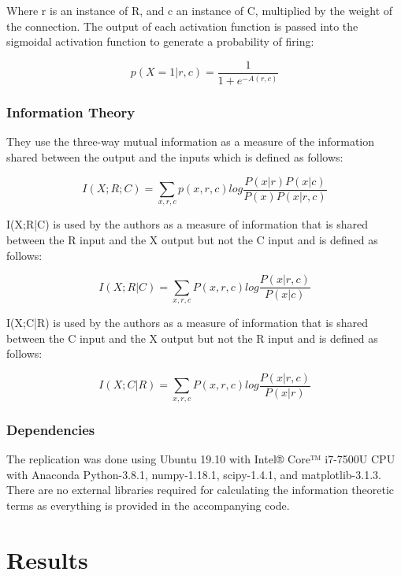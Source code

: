 Where r is an instance of  R, and c an instance of C, multiplied by the weight of the connection. The output of each activation function is passed into the sigmoidal activation function to generate a probability of firing:

\begin{equation}
p(X=1 | r,c) = \frac{1}{1 + e^{-A(r,c)}} 
\end{equation}


\subsubsection{Information Theory}
They use the three-way mutual information as a measure of the information shared between the output and the inputs which is defined as follows:

\begin{equation}
I(X;R;C) = \sum_{x,r,c}p(x,r,c)log\frac{P(x|r)P(x|c)}{P(x)P(x|r,c)}
\end{equation}

I(X;R|C) is used by the authors as a measure of information that is shared between the R input and the X output but not the C input and is defined as follows: 

\begin{equation}
I(X;R|C) = \sum_{x,r,c}P(x,r,c)log\frac{P(x|r,c)}{P(x|c)}
\end{equation}

I(X;C|R) is used by the authors as a measure of information that is shared between the C input and the X output but not the R input and is defined as follows:

\begin{equation}
I(X;C|R) = \sum_{x,r,c}P(x,r,c)log\frac{P(x|r,c)}{P(x|r)}
\end{equation}


\subsubsection{Dependencies} The replication was done using Ubuntu 19.10 with Intel® Core™ i7-7500U CPU with Anaconda Python-3.8.1, numpy-1.18.1, scipy-1.4.1, and matplotlib-3.1.3. There are no external libraries required for calculating the information theoretic terms as everything is provided in the accompanying code.

\section{Results}


